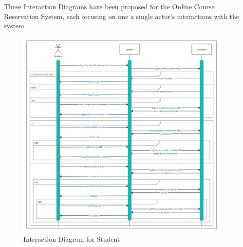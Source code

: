 \documentclass[12pt, a4]{report}
\begin{document}
\maketitle
\centering

Three Interaction Diagrams have been proposed for the Online Course Reservation System, each focusing on one a single actor's interactions with the system.

\begin{figure}[h]
    \centering
    \includegraphics[width=0.95\textwidth]{Diagrams/Student Interaction Diagram.png}
    \caption{Interaction Diagram for Student}
\end{figure}
\end{document}
